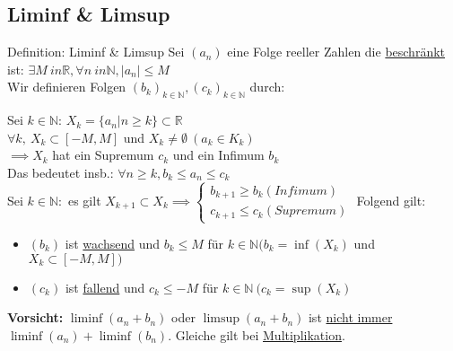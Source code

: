 \documentclass[a4paper,10pt]{article}
\begin{document}
\subsection{Liminf \& Limsup}
\begin{defbox}{Definition: Liminf \& Limsup}
    Sei $(a_n)$ eine Folge reeller Zahlen die \underline{beschränkt} ist: $\exists M \ in \mathbb R, \forall n \ in \mathbb N, |a_n|\le M$
    \\ Wir definieren Folgen $(b_k)_{k\in \mathbb N}, (c_k)_{k\in \mathbb N}$ durch:
    \begin{center}
        Sei $k \in \mathbb N$:
        $X_k=\{a_n|n\ge k\}\subset \mathbb R$
        \\ $\forall k, \ X_k\subset [-M,M]$ und $X_k\neq \emptyset \ (a_k \in K_k)$ 
        \\ $\implies X_k$ hat ein Supremum $c_k$ und ein Infimum $b_k$
        \\ Das bedeutet insb.: $\forall n \ge k, b_k\le a_n \le c_k$
        \\ Sei $k\in \mathbb N:$ es gilt $X_{k+1}\subset X_k\implies
        \begin{cases}
            b_{k+1}\ge b_k (Infimum)\\
            c_{k+1}\le c_k (Supremum)
        \end{cases}
        $
        Folgend gilt: 
        \begin{itemize}
            \item $(b_k)$ ist \underline{wachsend} und $b_k\le M$ für $k\in \mathbb N (b_k=\inf(X_k)$ und $X_k\subset [-M,M])$
            \item $(c_k)$ ist \underline{fallend} und $c_k\le -M$ für $k\in \mathbb N \ (c_k=\sup(X_k)$
        \end{itemize}
    \end{center}
\end{defbox}
\begin{flushleft}
    \textbf{Vorsicht:} $\liminf(a_n+b_n)$ oder $\limsup(a_n+b_n)$ ist \underline{nicht immer} $\liminf(a_n)+\liminf(b_n)$. Gleiche gilt bei \underline{Multiplikation}.
\end{flushleft}
\end{document}
